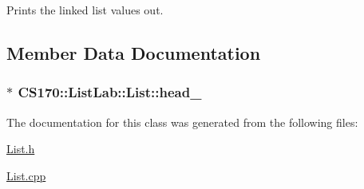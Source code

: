 Prints the linked list values out. 



\subsection{Member Data Documentation}
\hypertarget{class_c_s170_1_1_list_lab_1_1_list_a9fcc430ed0a61fc7d5159908da33cca1}{
\subsubsection[{head\-\_\-}]{$\ast$ {\bf C\-S170\-::\-List\-Lab\-::\-List\-::head\-\_\-}}}\label{class_c_s170_1_1_list_lab_1_1_list_a9fcc430ed0a61fc7d5159908da33cca1}


The documentation for this class was generated from the following files\-:\begin{DoxyCompactItemize}
\item 
\hyperlink{_list_8h}{List.\-h}\item 
\hyperlink{_list_8cpp}{List.\-cpp}\end{DoxyCompactItemize}
